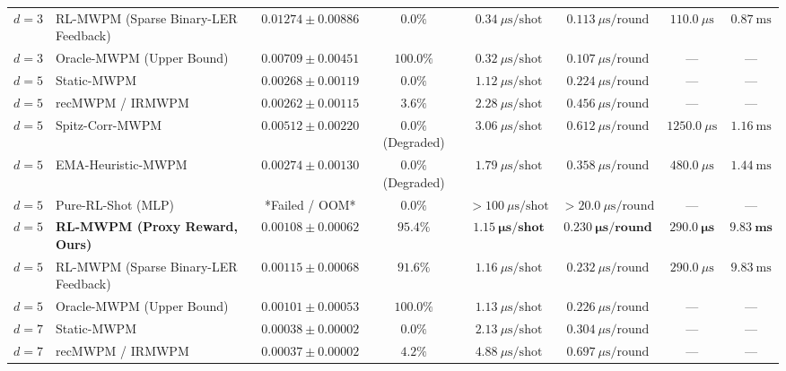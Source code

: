 \documentclass[aps,prxquantum,reprint,superscriptaddress,floatfix,nofootinbib]{revtex4-2}
\begin{document}
\begin{table}[t]
{\begin{tabular}{llcccccc}
$d=3$ & RL-MWPM (Sparse Binary-LER Feedback) & $0.01274 \pm 0.00886$ & $0.0\%$ & $0.34\ \mu\text{s}/\text{shot}$ & $0.113\ \mu\text{s}/\text{round}$ & $110.0\ \mu\text{s}$ & $0.87\ \text{ms}$ \\
$d=3$ & Oracle-MWPM (Upper Bound) & $0.00709 \pm 0.00451$ & $100.0\%$ & $0.32\ \mu\text{s}/\text{shot}$ & $0.107\ \mu\text{s}/\text{round}$ & --- & --- \\
\midrule
$d=5$ & Static-MWPM & $0.00268 \pm 0.00119$ & $0.0\%$ & $1.12\ \mu\text{s}/\text{shot}$ & $0.224\ \mu\text{s}/\text{round}$ & --- & --- \\
$d=5$ & recMWPM / IRMWPM~\cite{cowtan2023correlated,tian2025iterative} & $0.00262 \pm 0.00115$ & $3.6\%$ & $2.28\ \mu\text{s}/\text{shot}$ & $0.456\ \mu\text{s}/\text{round}$ & --- & --- \\
$d=5$ & Spitz-Corr-MWPM~\cite{spitz2018adaptive} & $0.00512 \pm 0.00220$ & $0.0\%$ (Degraded) & $3.06\ \mu\text{s}/\text{shot}$ & $0.612\ \mu\text{s}/\text{round}$ & $1250.0\ \mu\text{s}$ & $1.16\ \text{ms}$ \\
$d=5$ & EMA-Heuristic-MWPM & $0.00274 \pm 0.00130$ & $0.0\%$ (Degraded) & $1.79\ \mu\text{s}/\text{shot}$ & $0.358\ \mu\text{s}/\text{round}$ & $480.0\ \mu\text{s}$ & $1.44\ \text{ms}$ \\
$d=5$ & Pure-RL-Shot (MLP) & *Failed / OOM* & $0.0\%$ & $>100\ \mu\text{s}/\text{shot}$ & $>20.0\ \mu\text{s}/\text{round}$ & --- & --- \\
$d=5$ & \textbf{RL-MWPM (Proxy Reward, Ours)} & $\mathbf{0.00108 \pm 0.00062}$ & $\mathbf{95.4\%}$ & $\mathbf{1.15\ \mu\text{s}/\text{shot}}$ & $\mathbf{0.230\ \mu\text{s}/\text{round}}$ & $\mathbf{290.0\ \mu\text{s}}$ & $\mathbf{9.83\ \text{ms}}$ \\
$d=5$ & RL-MWPM (Sparse Binary-LER Feedback) & $0.00115 \pm 0.00068$ & $91.6\%$ & $1.16\ \mu\text{s}/\text{shot}$ & $0.232\ \mu\text{s}/\text{round}$ & $290.0\ \mu\text{s}$ & $9.83\ \text{ms}$ \\
$d=5$ & Oracle-MWPM (Upper Bound) & $0.00101 \pm 0.00053$ & $100.0\%$ & $1.13\ \mu\text{s}/\text{shot}$ & $0.226\ \mu\text{s}/\text{round}$ & --- & --- \\
\midrule
$d=7$ & Static-MWPM & $0.00038 \pm 0.00002$ & $0.0\%$ & $2.13\ \mu\text{s}/\text{shot}$ & $0.304\ \mu\text{s}/\text{round}$ & --- & --- \\
$d=7$ & recMWPM / IRMWPM~\cite{cowtan2023correlated,tian2025iterative} & $0.00037 \pm 0.00002$ & $4.2\%$ & $4.88\ \mu\text{s}/\text{shot}$ & $0.697\ \mu\text{s}/\text{round}$ & --- & --- \\

\end{tabular}}
\end{table}
\end{document}
